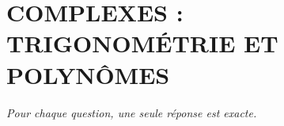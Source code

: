 
\section*{\textcolor{chapcolor}{\MakeUppercase{Complexes : trigonométrie et polynômes}}}

\begin{center}
\textit{Pour chaque question, une seule réponse est exacte.}
\end{center}

